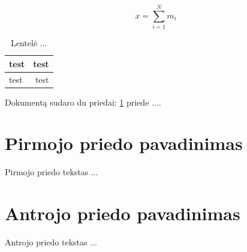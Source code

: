 \documentclass[a4paper,12pt,fleqn]{article}
\begin{document}
\begin{equation}
x = \sum_{i=1}^N m_i
\end{equation}

\begin{table}[!ht]\centering
\caption{Lentelė ... }
\label{tabl:table}
\begin{tabular}{l|r|}
test&test\\ \hline
test&test\\
\end{tabular}
\end{table}








\newpage
\begin{appendices}
Dokumentą sudaro du priedai: \ref{app:a} priede  ....
\newpage
\section{Pirmojo priedo pavadinimas}
\label{app:a}
Pirmojo priedo tekstas ...

\newpage
\section{Antrojo priedo pavadinimas}
Antrojo priedo tekstas ...

\end{appendices}
\end{document}

